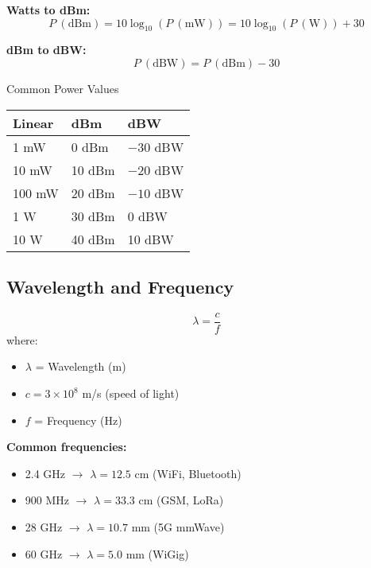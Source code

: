 \textbf{Watts to dBm:}
\begin{equation}
P\ (\text{dBm}) = 10\log_{10}(P\ (\text{mW})) = 10\log_{10}(P\ (\text{W})) + 30
\label{eq:power-dbm}
\end{equation}

\textbf{dBm to dBW:}
\begin{equation}
P\ (\text{dBW}) = P\ (\text{dBm}) - 30
\label{eq:dbm-to-dbw}
\end{equation}

\begin{calloutbox}{Common Power Values}
\begin{tabular}{@{}lll@{}}
\toprule
Linear & dBm & dBW \\
\midrule
1 mW & 0 dBm & $-30$ dBW \\
10 mW & 10 dBm & $-20$ dBW \\
100 mW & 20 dBm & $-10$ dBW \\
1 W & 30 dBm & 0 dBW \\
10 W & 40 dBm & 10 dBW \\
\bottomrule
\end{tabular}
\end{calloutbox}

\subsection{Wavelength and Frequency}

\begin{equation}
\lambda = \frac{c}{f}
\label{eq:wavelength-frequency}
\end{equation}
where:
\begin{itemize}
\item $\lambda$ = Wavelength (m)
\item $c = 3 \times 10^8$ m/s (speed of light)
\item $f$ = Frequency (Hz)
\end{itemize}

\textbf{Common frequencies:}
\begin{itemize}
\item 2.4 GHz $\rightarrow$ $\lambda = 12.5$ cm (WiFi, Bluetooth)
\item 900 MHz $\rightarrow$ $\lambda = 33.3$ cm (GSM, LoRa)
\item 28 GHz $\rightarrow$ $\lambda = 10.7$ mm (5G mmWave)
\item 60 GHz $\rightarrow$ $\lambda = 5.0$ mm (WiGig)
\end{itemize}

